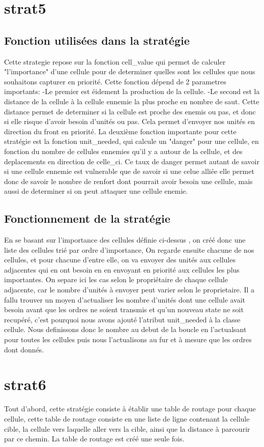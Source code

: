 \documentclass{rapport}
\begin{document}
		\section{strat5}
			\subsection{Fonction utilisées dans la stratégie}
Cette strategie repose sur la fonction cell\_value qui permet de calculer "l'importance" d'une cellule
pour de determiner quelles sont les cellules que nous souhaitons capturer en priorité.
Cette fonction dépend de 2 parametres importants:
		-Le premier est éidement la production de la cellule.
		-Le second est la distance de la cellule à la cellule ennemie la plus proche en nombre de saut. Cette distance
permet de determiner si la cellule est proche des enemis ou pas, et donc si elle risque d'avoir besoin d'unités ou pas.
Cela permet d'envoyer nos unités en direction du front en priorité.
La deuxième fonction importante pour cette stratégie est la fonction unit\_needed, qui calcule un "danger" pour une cellule,
en fonction du nombre de cellules ennemies qu'il y a autour de la cellule, et des deplacements en direction de celle\_ci.
Ce taux de danger permet autant de savoir si une cellule ennemie est vulnerable que de savoir si une celue alliée elle permet donc
de savoir le nombre de renfort dont pourrait avoir besoin une cellule, mais aussi de determiner si on peut attaquer une cellule enemie.
			\subsection{Fonctionnement de la stratégie}
En se basant sur l'importance des cellules définie ci-dessus , on créé donc une liste des cellules trié par ordre d'importance,
On regarde ensuite chacune de nos cellules, et pour chacune d'entre elle, on va envoyer des unités aux cellules adjacentes qui en ont besoin
en en envoyant en priorité aux cellules les plus importantes.
On separe ici les cas selon le propriétaire de chaque cellule adjacente, car le nombre d'unités à envoyer peut varier selon le proprietaire.
Il a fallu trouver un moyen d'actualiser les nombre d'unités dont une cellule avait besoin avant que les ordres ne soient transmis et qu'un nouveau
state ne soit recupéré, c'est pourquoi nous avons ajouté l'atribut unit\_needed à la classe cellule. Nous definissons donc le nombre au debut de la boucle
en l'actualsant pour toutes les cellules puis nous l'actualisons au fur et à mesure que les ordres dont donnés.
		\section{strat6}
			Tout d'abord, cette stratégie consiste à établir une table de routage pour chaque cellule, cette table de routage consiste en une liste de ligne contenant la cellule cible, la cellule vers laquelle aller vers la cible, ainsi que la distance à parcourir par ce chemin. La table de routage est créé une seule fois.
\end{document}

